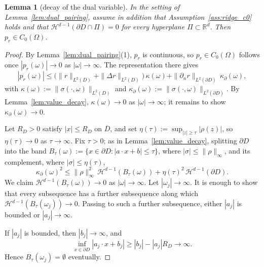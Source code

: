 \documentclass[11pt]{amsart}
\newtheorem{lemma}[theorem]{Lemma}
\theoremstyle{definition}
\theoremstyle{remark}
\begin{document}
\begin{lemma}[decay of the dual variable]\label{lem:dual_decay}
In the setting of Lemma~\ref{lem:dual_pairing}, assume in addition that
Assumption~\ref{ass:ridge_c0} holds and that
$\mathcal{H}^{d-1}(\partial D \cap \Pi) = 0$ for every hyperplane
$\Pi \subset \mathbb{R}^d$. Then $p_r \in C_0(\Omega)$.
\end{lemma}
\begin{proof}
By Lemma~\ref{lem:dual_pairing}(1), $p_r$ is continuous, so $p_r \in C_0(\Omega)$
follows once $|p_r(\omega)| \to 0$ as $|\omega| \to \infty$. The representation
there gives 
\begin{equation*}
	|p_r(\omega)|
	\le \big(\|r\|_{L^2(D)} + \|\Delta r\|_{L^2(D)}\big)\,\kappa(\omega)
	+ \|\partial_n r\|_{L^2(\partial D)}\,\kappa_\partial(\omega),
\end{equation*}
with $\kappa(\omega) := \|\sigma(\cdot,\omega)\|_{L^2(D)}$ and
$\kappa_\partial(\omega) := \|\sigma(\cdot,\omega)\|_{L^2(\partial D)}$. By
Lemma~\ref{lem:value_decay}, $\kappa(\omega) \to 0$ as $|\omega| \to \infty$; it
remains to show $\kappa_\partial(\omega) \to 0$.

Let $R_D > 0$ satisfy $|x| \le R_D$ on $\overline{D}$, and set
$\eta(\tau) := \sup_{|z| \ge \tau} |\rho(z)|$, so $\eta(\tau) \to 0$ as
$\tau \to \infty$. Fix $\tau > 0$; as in Lemma~\ref{lem:value_decay}, splitting
$\partial D$ into the band $B_\tau(\omega) := \{x \in \partial D : |a \cdot x + b|
\le \tau\}$, where $|\sigma| \le \|\rho\|_\infty$, and its complement, where
$|\sigma| \le \eta(\tau)$,
\begin{equation*}
	\kappa_\partial(\omega)^2
	\le \|\rho\|_\infty^2 \, \mathcal{H}^{d-1}(B_\tau(\omega))
	+ \eta(\tau)^2 \, \mathcal{H}^{d-1}(\partial D).
\end{equation*}
We claim $\mathcal{H}^{d-1}(B_\tau(\omega)) \to 0$ as $|\omega| \to \infty$.
Let $|\omega_j| \to \infty$. It is enough to show that every subsequence has a
further subsequence along which
$\mathcal{H}^{d-1}(B_\tau(\omega_j)) \to 0$. Passing to such a further
subsequence, either $|a_j|$ is bounded or $|a_j| \to \infty$.

If $|a_j|$ is bounded, then $|b_j| \to \infty$, and
\begin{equation*}
	\inf_{x\in\partial D}|a_j\cdot x+b_j|
	\ge |b_j|-|a_j|R_D \to \infty.
\end{equation*}
Hence $B_\tau(\omega_j)=\emptyset$ eventually.


\end{proof}
\end{document}
